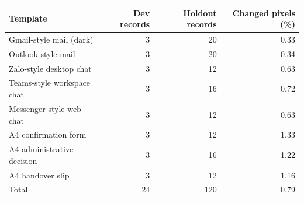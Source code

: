 \begin{tabular}{lrrr}
\toprule
Template & Dev records & Holdout records & Changed pixels (\%) \\
\midrule
Gmail-style mail (dark) & 3 & 20 & 0.33 \\
Outlook-style mail & 3 & 20 & 0.34 \\
Zalo-style desktop chat & 3 & 12 & 0.63 \\
Teams-style workspace chat & 3 & 16 & 0.72 \\
Messenger-style web chat & 3 & 12 & 0.63 \\
A4 confirmation form & 3 & 12 & 1.33 \\
A4 administrative decision & 3 & 16 & 1.22 \\
A4 handover slip & 3 & 12 & 1.16 \\
\midrule
Total & 24 & 120 & 0.79 \\
\bottomrule
\end{tabular}

